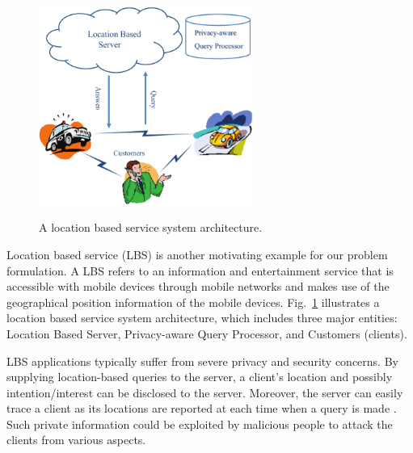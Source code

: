 \documentclass[letterpaper,12pt]{article}
\begin{document}
\begin{figure}[t] \centering
  \includegraphics[width=7cm]{Location_Based_Service}\\
  \caption{A location based service system architecture. } \label{sec:Fig2:Location_Based_Service}
\end{figure}

Location based service (LBS) is another motivating example for our problem formulation. A LBS refers to an information and entertainment service that is accessible with mobile devices through mobile networks and makes use of the geographical position information of the mobile devices. Fig.~\ref{sec:Fig2:Location_Based_Service} illustrates a location based service system architecture, which includes three major entities: Location Based Server, Privacy-aware Query Processor, and Customers (clients).

LBS applications typically suffer from severe privacy and security concerns. By supplying location-based queries to the server, a client's location and possibly intention/interest can be disclosed to the server. Moreover, the server can easily trace a client as its locations are reported at each time when a query is made \cite{ma2013privacy,de2013unique}. Such private information could be exploited by malicious people to attack the clients from various aspects.
\end{document}
